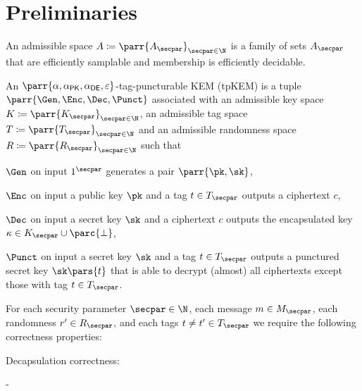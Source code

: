 \section{Preliminaries}
\label{sec:prelims}

\begin{definition}
    An admissible space \(A \coloneqq \parr{A_\secpar}_{\secpar \in \N}\) is a family of sets \(A_\secpar\) that are efficiently samplable and membership is efficiently decidable.
\end{definition}

\begin{definition}
    An \(\parr{\alpha,\alpha_{\textsf{PK}},\alpha_{\textsf{DE}},\varepsilon}\)-tag-puncturable KEM (tpKEM) is a tuple \(\parr{\Gen,\Enc,\Dec,\Punct}\) associated with
    an admissible key space \(K \coloneqq \parr{K_\secpar}_{\secpar \in \N}\),
    an admissible tag space \(T \coloneqq \parr{T_\secpar}_{\secpar \in \N}\) and
    an admissible randomness space \(R \coloneqq \parr{R_\secpar}_{\secpar \in \N}\) such that
    \begin{sitemize}
        \item \(\Gen\) on input \(1^\secpar\) generates a pair \(\parr{\pk,\sk}\),
        \item \(\Enc\) on input a public key \(\pk\) and a tag \(t \in T_\secpar\) outputs a ciphertext \(c\),
        \item \(\Dec\) on input a secret key \(\sk\) and a ciphertext \(c\) outputs the encapsulated key \(\kappa \in K_\secpar \cup \parc{\bot}\),
        \item \(\Punct\) on input a secret key \(\sk\) and a tag \(t \in T_\secpar\) outputs a punctured secret key \(\sk\pars{t}\) that is able to decrypt (almost) all ciphertexts except those with tag \(t \in T_\secpar\).
    \end{sitemize}
    For each security parameter \(\secpar \in \N\),
    each message \(m \in M_\secpar\),
    each randomness \(r' \in R_\secpar\),
    and each tags \(t \neq t' \in T_\secpar\) we require the following correctness properties:
    \begin{sitemize}
        \item Decapsulation correctness:
        \begin{bralign}
             - \alpha\parr{\secpar}
        \end{bralign}


\end{sitemize}
\end{definition}
